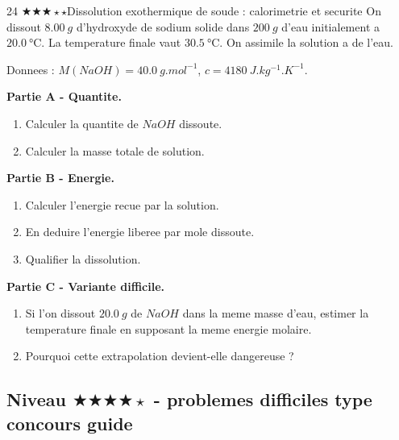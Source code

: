 \documentclass[11pt,a4paper]{article}
\newcommand{\diffthree}{\(\bigstar\bigstar\bigstar\star\star\)}
\newcommand{\difffour}{\(\bigstar\bigstar\bigstar\bigstar\star\)}
\begin{document}
\begin{probleme}{24 \diffthree}{Dissolution exothermique de soude : calorimetrie et securite}
On dissout \(\SI{8.00}{g}\) d'hydroxyde de sodium solide dans \(\SI{200}{g}\) d'eau initialement a \(\SI{20.0}{\celsius}\). La temperature finale vaut \(\SI{30.5}{\celsius}\). On assimile la solution a de l'eau.

Donnees : \(M(NaOH)=\SI{40.0}{g.mol^{-1}}\), \(c=\SI{4180}{J.kg^{-1}.K^{-1}}\).

\textbf{Partie A - Quantite.}
\begin{enumerate}
\item Calculer la quantite de \(NaOH\) dissoute.
\item Calculer la masse totale de solution.
\end{enumerate}

\textbf{Partie B - Energie.}
\begin{enumerate}[resume]
\item Calculer l'energie recue par la solution.
\item En deduire l'energie liberee par mole dissoute.
\item Qualifier la dissolution.
\end{enumerate}

\textbf{Partie C - Variante difficile.}
\begin{enumerate}[resume]
\item Si l'on dissout \(\SI{20.0}{g}\) de \(NaOH\) dans la meme masse d'eau, estimer la temperature finale en supposant la meme energie molaire.
\item Pourquoi cette extrapolation devient-elle dangereuse ?
\end{enumerate}
\end{probleme}

\subsection{Niveau \difffour{} - problemes difficiles type concours guide}
\end{document}
